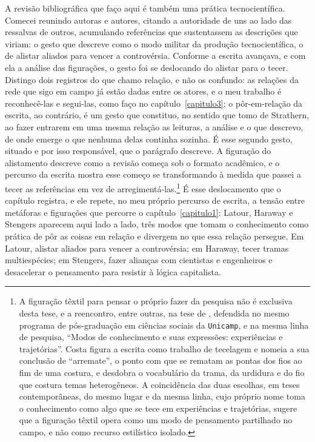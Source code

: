 A revisão bibliográfica que faço aqui é também uma prática tecnocientífica. Comecei reunindo autoras e autores, citando a autoridade de uns ao lado das ressalvas de outros, acumulando referências que sustentassem as descrições que viriam: o gesto que \textcite[cap.~1]{Latour2011CienciaEmAcao} descreve como o modo militar da produção tecnocientífica, o de alistar aliados para vencer a controvérsia. Conforme a escrita avançava, e com ela a análise das figurações, o gesto foi se deslocando do alistar para o tecer. Distingo dois registros do que chamo relação, e não os confundo: as relações da rede que sigo em campo já estão dadas entre os atores, e o meu trabalho é reconhecê-las e segui-las, como faço no capítulo~\ref{capitulo3}; o pôr-em-relação da escrita, ao contrário, é um gesto que constituo, no sentido que tomo de Strathern, ao fazer entrarem em uma mesma relação as leituras, a análise e o que descrevo, de onde emerge o que nenhuma delas continha sozinha. É esse segundo gesto, situado e por isso responsável, que o parágrafo descreve. A figuração do alistamento descreve como a revisão começa sob o formato acadêmico, e o percurso da escrita mostra esse começo se transformando à medida que passei a tecer as referências em vez de arregimentá-las.\footnote{A figuração têxtil para pensar o próprio fazer da pesquisa não é exclusiva desta tese, e a reencontro, entre outras, na tese de \textcite{costa2024manchando}, defendida no mesmo programa de pós-graduação em ciências sociais da \texttt{Unicamp}, e na mesma linha de pesquisa, \enquote{Modos de conhecimento e suas expressões: experiências e trajetórias}. Costa figura a escrita como trabalho de tecelagem e nomeia a sua conclusão de \enquote{arremate}, o ponto com que se rematam as pontas dos fios ao fim de uma costura, e desdobra o vocabulário da trama, da urdidura e do fio que costura temas heterogêneos. A coincidência das duas escolhas, em teses contemporâneas, do mesmo lugar e da mesma linha, cujo próprio nome toma o conhecimento como algo que se tece em experiências e trajetórias, sugere que a figuração têxtil opera como um modo de pensamento partilhado no campo, e não como recurso estilístico isolado.} É esse deslocamento que o capítulo registra, e ele repete, no meu próprio percurso de escrita, a tensão entre metáforas e figurações que percorre o capítulo~\ref{capitulo1}: Latour, Haraway e Stengers aparecem aqui lado a lado, três modos que tomam o conhecimento como prática de pôr as coisas em relação e divergem no que essa relação persegue. Em Latour, alistar aliados para vencer a controvérsia; em Haraway, tecer tramas multiespécies; em Stengers, fazer alianças com cientistas e engenheiros e desacelerar o pensamento para resistir à lógica capitalista.

